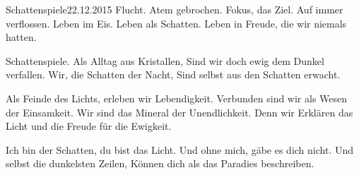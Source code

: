\begin{poem}{Schattenspiele}{22.12.2015}
Flucht. Atem gebrochen.
Fokus, das Ziel. Auf immer verflossen.
Leben im Eis. Leben als Schatten.
Leben in Freude, die wir niemals hatten.

Schattenspiele. Als Alltag aus Kristallen,
Sind wir doch ewig dem Dunkel verfallen.
Wir, die Schatten der Nacht,
Sind selbst aus den Schatten erwacht.

Als Feinde des Lichts, erleben wir
Lebendigkeit. Verbunden sind wir
als Wesen der Einsamkeit. Wir
sind das Mineral der Unendlichkeit. Denn wir
Erklären das Licht und die Freude für die Ewigkeit.

Ich bin der Schatten, du bist das Licht.
Und ohne mich, gäbe es dich nicht.
Und selbst die dunkelsten Zeilen,
Können dich als das Paradies beschreiben.
\end{poem}